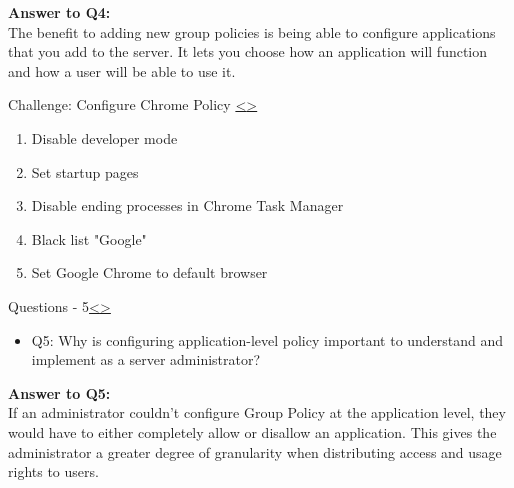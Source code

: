 \documentclass[12pt]{extarticle}
\newenvironment{instructionblock}{\Large\bgroup}{\egroup}
\newcommand{\ben}{\begin{enumerate}}
\newcommand{\een}{\end{enumerate}}
\newcommand{\bi}{\begin{itemize}}
\newcommand{\ei}{\end{itemize}}
\begin{document}
\vspace{6mm}
\noindent
\textbf{Answer to Q4:}\\
The benefit to adding new group policies is being able to configure applications that you add to the server. It lets you choose how an application will function and how a user will be able to use it.


\pagebreak
\begin{slide}{Challenge: Configure Chrome Policy }{\hyperref[slide 10]{\textless}\hyperref[slide 12]{\textgreater}}
\begin{instructionblock}
\ben
	\item Disable developer mode
	\item Set startup pages
	\item Disable ending processes in Chrome Task Manager
	\item Black list "Google"
	\item Set Google Chrome to default browser
\een
\end{instructionblock}
\end{slide}


\pagebreak
\begin{slide}{Questions - 5}{\hyperref[slide 11]{\textless}\hyperref[slide 13]{\textgreater}}
\begin{instructionblock}
\bi 
\item[Q5:] Why is configuring application-level policy important to understand and implement as a server administrator?
\ei

\end{instructionblock}
\end{slide}
\vfill

\vspace{2mm}
\noindent
\textbf{Answer to Q5:}\\
If an administrator couldn't configure Group Policy at the application level, they would have to either completely allow or disallow an application. This gives the administrator a greater degree of granularity when distributing access and usage rights to users.
\end{document}
